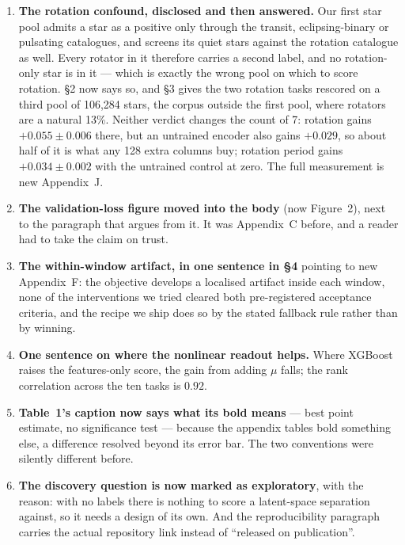 \documentclass[10pt]{article}
\begin{document}
\begin{enumerate}[leftmargin=*, itemsep=4pt]

\item \textbf{The rotation confound, disclosed and then answered.} Our first star pool admits a star
as a positive only through the transit, eclipsing-binary or pulsating catalogues, and screens its
quiet stars against the rotation catalogue as well. Every rotator in it therefore carries a second
label, and no rotation-only star is in it --- which is exactly the wrong pool on which to score
rotation. \S2 now says so, and \S3 gives the two rotation tasks rescored on a third pool of 106,284
stars, the corpus outside the first pool, where rotators are a natural 13\%. Neither verdict changes
the count of 7: rotation gains $+0.055 \pm 0.006$ there, but an untrained encoder also gains
$+0.029$, so about half of it is what any 128 extra columns buy; rotation period gains
$+0.034 \pm 0.002$ with the untrained control at zero. The full measurement is new Appendix~J.

\item \textbf{The validation-loss figure moved into the body} (now Figure~2), next to the paragraph
that argues from it. It was Appendix~C before, and a reader had to take the claim on trust.

\item \textbf{The within-window artifact, in one sentence in \S4} pointing to new Appendix~F: the
objective develops a localised artifact inside each window, none of the interventions we tried
cleared both pre-registered acceptance criteria, and the recipe we ship does so by the stated
fallback rule rather than by winning.

\item \textbf{One sentence on where the nonlinear readout helps.} Where XGBoost raises the
features-only score, the gain from adding $\mu$ falls; the rank correlation across the ten tasks is
$0.92$.

\item \textbf{Table~1's caption now says what its bold means} --- best point estimate, no
significance test --- because the appendix tables bold something else, a difference resolved beyond
its error bar. The two conventions were silently different before.

\item \textbf{The discovery question is now marked as exploratory}, with the reason: with no labels
there is nothing to score a latent-space separation against, so it needs a design of its own. And the
reproducibility paragraph carries the actual repository link instead of ``released on publication''.

\end{enumerate}
\end{document}

